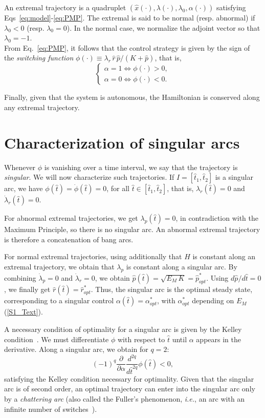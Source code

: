 \documentclass[a4paper,12pt]{article}
\newcommand{\tr}[1]{{#1}}
\begin{document}
An extremal trajectory is a quadruplet $(\hat{x}(\cdot),\lambda(\cdot),\lambda_0,\alpha(\cdot))$ satisfying Eqs~\ref{eq:model}-\ref{eq:PMP}. \tr{The extremal is said to be normal (resp. abnormal) if $\lambda_0<0$ (resp. $\lambda_0=0$). In the normal case, we normalize the adjoint vector so that $\lambda_0=-1$.}\\

From Eq.~\ref{eq:PMP}, it follows that the control strategy is given by the sign of the \textit{switching function} $\phi(\cdot) \equiv \lambda_r \, \hat{r}\, \hat{p}/(K+\hat{p})$, that is,
\[
\begin{cases}
\alpha=1 \iff \phi(\cdot) >0,\\
\alpha=0 \iff \phi(\cdot)<0.
\end{cases}
\]

\tr{Finally, given that the system is autonomous, the Hamiltonian is conserved along any extremal trajectory.}

\section{Characterization of singular arcs}

Whenever $\phi$ is vanishing over a time interval, we say that the trajectory is \textit{singular}.
We will now characterize such trajectories.
If $I=[\hat{t}_1,\hat{t}_2]$ is a singular arc, we have $\phi(\hat{t})=\dot{\phi}(\hat{t})=0$, for all $\hat{t}\in[\hat{t}_1,\hat{t}_2]$, that is, $\lambda_r(\hat{t})=0$ and $\dot\lambda_r(\hat{t})=0$. 

\tr{For abnormal extremal} \tr{trajectories}, \tr{we get $\lambda_p(\hat{t})=0$, in contradiction with the Maximum Principle, so there is no singular arc.} \tr{An abnormal extremal trajectory is therefore a concatenation of bang arcs.}

\tr{For normal extremal} \tr{trajectories}, using additionally that $H$ is constant along an extremal trajectory, we obtain that $\lambda_p$ is constant along a singular arc. \tr{By combining $\dot \lambda_p=0$ and $\dot \lambda_r=0$, we obtain} $\hat{p}(\hat{t})=\sqrt{E_M\, K}=\hat{p}_{opt}^*$. Using $d\hat{p}/d\hat{t}=0$, we finally get $\hat{r}(\hat{t})=\hat{r}_{opt}^*$.
Thus, the singular arc is the optimal steady state, corresponding to a singular control \tr{$\alpha(\hat{t})=\alpha_{opt}^*$, with $\alpha_{opt}^*$} depending on $E_M$ (\ref{S1_Text}).

A necessary condition of optimality for a singular arc is given by the Kelley condition~\cite{borisov_fullers_2000}.
We must differentiate $\phi$ with respect to $\hat{t}$ until $\alpha$ appears in the derivative. Along a singular arc, we obtain for $q=2$:
$$
(-1)^q\frac{\partial}{\partial\alpha}\frac{d^{2q}}{d\hat{t}^{2q}}\phi(\hat{t})<0,
$$
satisfying the Kelley condition necessary for optimality. Given that the singular arc is of second order, an optimal trajectory can enter into the singular arc only by a \textit{chattering arc} (also called the Fuller's phenomenon, \textit{i.e.}, an arc with an infinite number of switches~\cite{borisov_fullers_2000,marchal_chattering_2013}). \\
\end{document}
